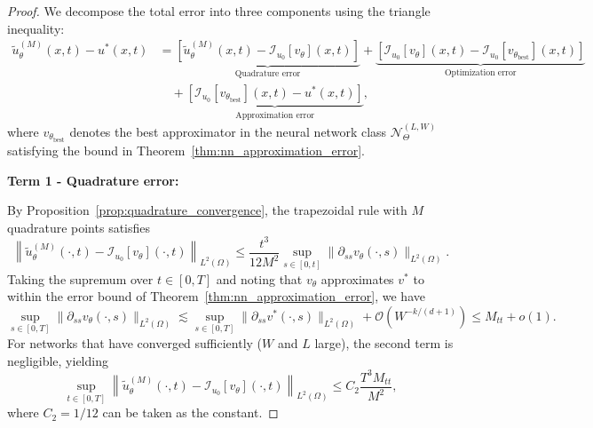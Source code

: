 \documentclass[11pt,reqno]{amsart}
\theoremstyle{plain}
\theoremstyle{definition}
\theoremstyle{remark}
\begin{document}
\begin{proof}
We decompose the total error into three components using the triangle inequality:
\begin{equation}\label{eq:error_decomposition}
\begin{aligned}
    \tilde{u}_\theta^{(M)}(x,t) - u^*(x,t) 
    &= \underbrace{\left[ \tilde{u}_\theta^{(M)}(x,t) - \mathcal{I}_{u_0}[v_\theta](x,t) \right]}_{\text{Quadrature error}} 
     + \underbrace{\left[ \mathcal{I}_{u_0}[v_\theta](x,t) - \mathcal{I}_{u_0}[v_{\theta_{\mathrm{best}}}](x,t) \right]}_{\text{Optimization error}} \\
    &\quad + \underbrace{\left[ \mathcal{I}_{u_0}[v_{\theta_{\mathrm{best}}}](x,t) - u^*(x,t) \right]}_{\text{Approximation error}},
\end{aligned}
\end{equation}
where $v_{\theta_{\mathrm{best}}}$ denotes the best approximator in the neural network class $\mathcal{N}_{\Theta}^{(L,W)}$ satisfying the bound in Theorem~\ref{thm:nn_approximation_error}.

\medskip
\noindent\textbf{Term 1 - Quadrature error:}

\noindent By Proposition~\ref{prop:quadrature_convergence}, the trapezoidal rule with $M$ quadrature points satisfies
\begin{equation}
    \left\| \tilde{u}_\theta^{(M)}(\cdot,t) - \mathcal{I}_{u_0}[v_\theta](\cdot,t) \right\|_{L^2(\Omega)} \leq \frac{t^3}{12M^2} \sup_{s \in [0,t]} \|\partial_{ss} v_\theta(\cdot, s)\|_{L^2(\Omega)}.
\end{equation}
Taking the supremum over $t \in [0,T]$ and noting that $v_\theta$ approximates $v^*$ to within the error bound of Theorem~\ref{thm:nn_approximation_error}, we have
\begin{equation}
    \sup_{s \in [0,T]} \|\partial_{ss} v_\theta(\cdot, s)\|_{L^2(\Omega)} \lesssim \sup_{s \in [0,T]} \|\partial_{ss} v^*(\cdot, s)\|_{L^2(\Omega)} + \mathcal{O}(W^{-k/(d+1)}) \leq M_{tt} + o(1).
\end{equation}
For networks that have converged sufficiently ($W$ and $L$ large), the second term is negligible, yielding
\begin{equation}\label{eq:quad_error_bound}
    \sup_{t \in [0,T]} \left\| \tilde{u}_\theta^{(M)}(\cdot,t) - \mathcal{I}_{u_0}[v_\theta](\cdot,t) \right\|_{L^2(\Omega)} \leq C_2 \frac{T^3 M_{tt}}{M^2},
\end{equation}
where $C_2 = 1/12$ can be taken as the constant.


\end{proof}
\end{document}
